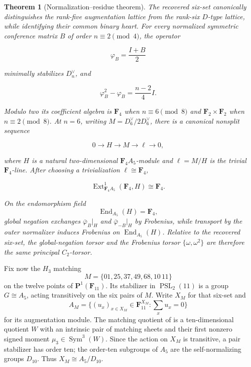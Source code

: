 \documentclass[11pt]{article}
\newtheorem{theorem}{Theorem}[section]
\theoremstyle{definition}
\theoremstyle{remark}
\newcommand{\F}{\mathbf F}
\newcommand{\PP}{\mathbf P}
\newcommand{\Sym}{\operatorname{Sym}}
\newcommand{\End}{\operatorname{End}}
\newcommand{\Ext}{\operatorname{Ext}}
\begin{document}
\begin{theorem}[Normalization--residue theorem]
\label{thm:normalization-residue-intro}
The recovered six-set canonically distinguishes the rank-five augmentation
lattice from the rank-six \(D\)-type lattice, while identifying their common
binary heart.  For every normalized symmetric conference matrix \(B\) of
order \(n\equiv2\pmod4\), the operator

\[
                         \varphi_B=\frac{I+B}{2}
\]

minimally stabilizes \(D_n^\vee\), and

\[
       \varphi_B^2-\varphi_B=\frac{n-2}{4}I.
\]

Modulo two its coefficient algebra is \(\F_4\) when \(n\equiv6\pmod8\) and
\(\F_2\times\F_2\) when \(n\equiv2\pmod8\).  At \(n=6\), writing
\(M=D_6^\vee/2D_6^\vee\), there is a canonical nonsplit sequence

\[
 0\longrightarrow H\longrightarrow M\longrightarrow\ell\longrightarrow0,
\]

where \(H\) is a natural two-dimensional \(\F_4A_5\)-module and
\(\ell=M/H\) is the trivial \(\F_4\)-line.  After choosing a trivialization
\(\ell\cong\F_4\),

\[
       \Ext^1_{\F_4A_5}(\F_4,H)\cong\F_4.
\]

On the endomorphism field
\[
                         \End_{A_5}(H)=\F_4,
\]
global negation exchanges \(\bar\varphi_B|_H\) and
\(\bar\varphi_{-B}|_H\) by Frobenius, while transport by the outer normalizer
induces Frobenius on \(\End_{A_5}(H)\).  Relative to the recovered six-set, the global-negation torsor
and the Frobenius torsor \(\{\omega,\omega^2\}\) are therefore the same principal
\(C_2\)-torsor.
\end{theorem}

Fix now the \(H_3\) matching
\[
 M=\{01,25,37,49,68,10\,11\}
\]
on the twelve points of \(\PP^1(\F_{11})\).  Its stabilizer in
\(\operatorname{PSL}_2(11)\) is a group \(G\cong A_5\), acting transitively
on the six pairs of \(M\).  Write \(X_M\) for that six-set and
\[
 A_M=\bigl\{(u_x)_{x\in X_M}\in\F_{11}^{X_M}:
                 \textstyle\sum_xu_x=0\bigr\}
\]
for its augmentation module.  The matching quotient of
\cite{RuddFactorization2026} is a ten-dimensional quotient \(W\) with an
intrinsic pair of matching sheets and their first nonzero signed moment
\(\mu_3\in\Sym^3(W)\).
Since the action on \(X_M\) is transitive, a pair stabilizer has order ten;
the order-ten subgroups of \(A_5\) are the self-normalizing groups
\(D_{10}\).  Thus \(X_M\cong A_5/D_{10}\).
\end{document}
